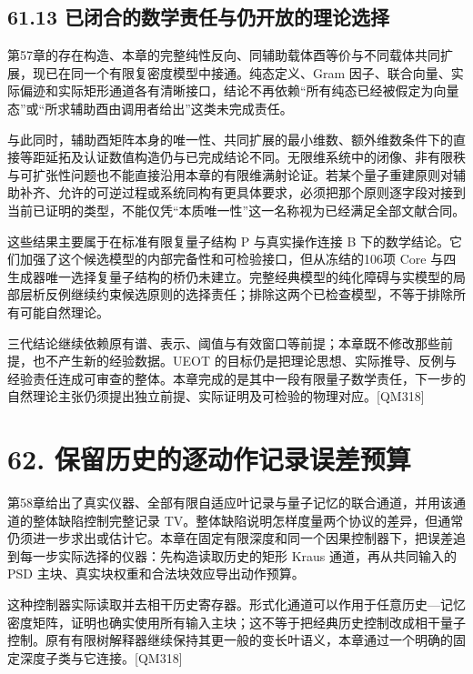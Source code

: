 \documentclass[
  11pt,
  oneside]{book}
\begin{document}
\hypertarget{ux5df2ux95edux5408ux7684ux6570ux5b66ux8d23ux4efbux4e0eux4ecdux5f00ux653eux7684ux7406ux8bbaux9009ux62e9}{%
\section{61.13
已闭合的数学责任与仍开放的理论选择}\label{ux5df2ux95edux5408ux7684ux6570ux5b66ux8d23ux4efbux4e0eux4ecdux5f00ux653eux7684ux7406ux8bbaux9009ux62e9}}

第57章的存在构造、本章的完整纯性反向、同辅助载体酉等价与不同载体共同扩展，现已在同一个有限复密度模型中接通。纯态定义、Gram
因子、联合向量、实际偏迹和实际矩形通道各有清晰接口，结论不再依赖``所有纯态已经被假定为向量态''或``所求辅助酉由调用者给出''这类未完成责任。

与此同时，辅助酉矩阵本身的唯一性、共同扩展的最小维数、额外维数条件下的直接等距延拓及认证数值构造仍与已完成结论不同。无限维系统中的闭像、非有限秩与可扩张性问题也不能直接沿用本章的有限维满射论证。若某个量子重建原则对辅助补齐、允许的可逆过程或系统同构有更具体要求，必须把那个原则逐字段对接到当前已证明的类型，不能仅凭``本质唯一性''这一名称视为已经满足全部文献合同。

这些结果主要属于在标准有限复量子结构 P 与真实操作连接 B
下的数学结论。它们加强了这个候选模型的内部完备性和可检验接口，但从冻结的106项
Core
与四生成器唯一选择复量子结构的桥仍未建立。完整经典模型的纯化障碍与实模型的局部层析反例继续约束候选原则的选择责任；排除这两个已检查模型，不等于排除所有可能自然理论。

三代结论继续依赖原有谱、表示、阈值与有效窗口等前提；本章既不修改那些前提，也不产生新的经验数据。UEOT
的目标仍是把理论思想、实际推导、反例与经验责任连成可审查的整体。本章完成的是其中一段有限量子数学责任，下一步的自然理论主张仍须提出独立前提、实际证明及可检验的物理对应。{[}QM318{]}

\hypertarget{ch-62}{%
\chapter{62. 保留历史的逐动作记录误差预算}\label{ch-62}}

第58章给出了真实仪器、全部有限自适应叶记录与量子记忆的联合通道，并用该通道的整体缺陷控制完整记录
TV。整体缺陷说明怎样度量两个协议的差异，但通常仍须进一步求出或估计它。本章在固定有限深度和同一个因果控制器下，把误差追到每一步实际选择的仪器：先构造读取历史的矩形
Kraus 通道，再从共同输入的 PSD
主块、真实块权重和合法块效应导出动作预算。

这种控制器实际读取并去相干历史寄存器。形式化通道可以作用于任意历史---记忆密度矩阵，证明也确实使用所有输入主块；这不等于把经典历史控制改成相干量子控制。原有有限树解释器继续保持其更一般的变长叶语义，本章通过一个明确的固定深度子类与它连接。{[}QM318{]}
\end{document}
